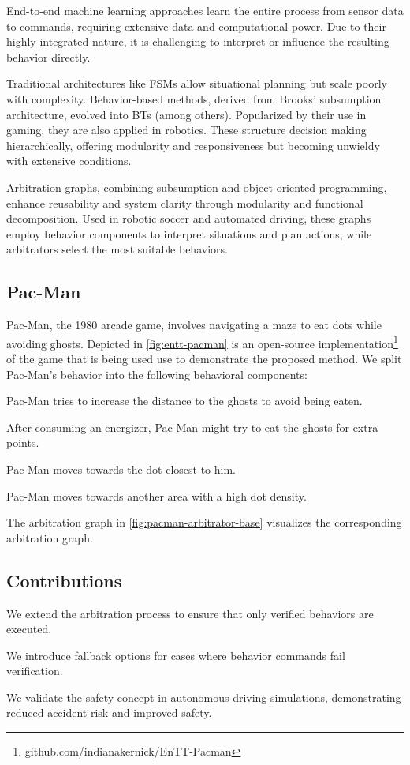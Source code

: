 End-to-end machine learning approaches learn the entire process from sensor data to commands, requiring extensive data and computational power.
Due to their highly integrated nature, it is challenging to interpret or influence the resulting behavior directly.

Traditional architectures like \glspl{FSM} allow situational planning but scale poorly with complexity. Behavior-based methods, derived from Brooks' subsumption architecture, evolved into \glspl{BT} (among others). Popularized by their use in gaming, they are also applied in robotics. These structure decision making hierarchically, offering modularity and responsiveness but becoming unwieldy with extensive conditions.

Arbitration graphs, combining subsumption and object-oriented programming, enhance reusability and system clarity through modularity and functional decomposition. Used in robotic soccer and automated driving, these graphs employ behavior components to interpret situations and plan actions, while arbitrators select the most suitable behaviors.

\subsection{Pac-Man}
Pac-Man, the 1980 arcade game, involves navigating a maze to eat dots while avoiding ghosts.
Depicted in \cref{fig:entt-pacman} is an open-source implementation\footnote{github.com/indianakernick/EnTT-Pacman} of the game that is being used use to demonstrate the proposed method.
We split Pac-Man's behavior into the following behavioral components:
\begin{description}[align=left]
    \item[Avoid Ghosts] Pac-Man tries to increase the distance to the ghosts to avoid being eaten.
    \item[Chase Ghosts] After consuming an energizer, Pac-Man might try to eat the ghosts for extra points.
    \item[Eat Closest Dot] Pac-Man moves towards the dot closest to him.
    \item[Change Dot Cluster] Pac-Man moves towards another area with a high dot density.
\end{description}

The arbitration graph in \cref{fig:pacman-arbitrator-base} visualizes the corresponding arbitration graph.

\subsection{Contributions}

\begin{description}[align=left]
    \item[Verification Logic] We extend the arbitration process to ensure that only verified behaviors are executed.
    \item[Fallback Logic] We introduce fallback options for cases where behavior commands fail verification.
    \item[Application] We validate the safety concept in autonomous driving simulations, demonstrating reduced accident risk and improved safety.
\end{description}
